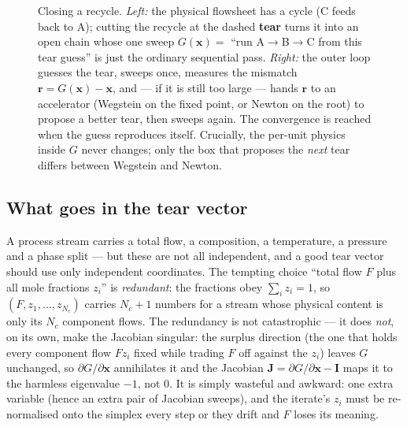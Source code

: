 \documentclass[11pt,a4paper]{article}
\newcommand{\xv}{\mathbf{x}}
\newcommand{\Jac}{\mathbf{J}}
\newcommand{\rv}{\mathbf{r}}                          %
\begin{document}
\begin{figure}[h]
\caption{Closing a recycle.  \emph{Left:} the physical flowsheet has a
cycle (C feeds back to A); cutting the recycle at the dashed
\textbf{tear} turns it into an open chain whose one sweep
$G(\xv)=$ ``run A$\to$B$\to$C from this tear guess'' is just the
ordinary sequential pass.  \emph{Right:} the outer loop guesses the
tear, sweeps once, measures the mismatch $\rv=G(\xv)-\xv$, and --- if it
is still too large --- hands $\rv$ to an accelerator (Wegstein on the
fixed point, or Newton on the root) to propose a better tear, then
sweeps again.  The convergence is reached when the guess reproduces
itself.  Crucially, the per-unit physics inside $G$ never changes; only
the box that proposes the \emph{next} tear differs between Wegstein and
Newton.}
\label{fig:recycle-tear-loop}
\end{figure}

\subsection{What goes in the tear vector}

A process stream carries a total flow, a composition, a temperature,
a pressure and a phase split --- but these are not all independent, and
a good tear vector should use only independent coordinates.  The
tempting choice ``total flow $F$ plus all mole fractions $z_i$'' is
\emph{redundant}: the fractions obey $\sum_i z_i = 1$, so
$(F, z_1, \dots, z_{N_c})$ carries $N_c + 1$ numbers for a stream whose
physical content is only its $N_c$ component flows.  The redundancy is
not catastrophic --- it does \emph{not}, on its own, make the Jacobian
singular: the surplus direction (the one that holds every component
flow $F z_i$ fixed while trading $F$ off against the $z_i$) leaves $G$
unchanged, so $\partial G/\partial\mathbf{x}$ annihilates it and the
Jacobian $\Jac = \partial G/\partial\mathbf{x} - \mathbf{I}$ maps it to
the harmless eigenvalue $-1$, not $0$.  It is simply wasteful and
awkward: one extra variable (hence an extra pair of Jacobian sweeps),
and the iterate's $z_i$ must be re-normalised onto the simplex every
step or they drift and $F$ loses its meaning.
\end{document}

